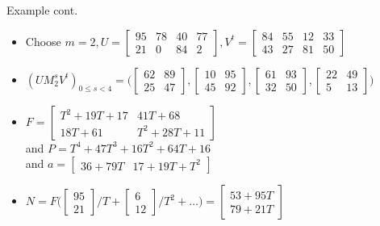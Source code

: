 \documentclass{beamer}
\begin{document}
\begin{frame}{Example cont.}
	\begin{itemize}
		\item Choose $m = 2, 
		U = \begin{bmatrix}
		95 & 78 & 40 & 77\\
		21 & 0  & 84 & 2
		\end{bmatrix},
		V^t = \begin{bmatrix}
		84 & 55 & 12 & 33\\
		43 & 27 & 81 & 50
		\end{bmatrix}
		$
		\item $(UM_2^sV^t)_{0 \le s < 4} = 
		\bigg(  
		\begin{bmatrix}
		62& 89\\
		25& 47
		\end{bmatrix},
		\begin{bmatrix}
		10& 95\\
		45& 92
		\end{bmatrix},
		\begin{bmatrix}
		61& 93\\
		32& 50
		\end{bmatrix},
		\begin{bmatrix}
		22& 49\\
		 5& 13
		\end{bmatrix} 
		\bigg)$
		\pause
		\item $F = \begin{bmatrix}
		T^2 + 19T + 17&       41T + 68\\
		      18T + 61& T^2 + 28T + 11
		\end{bmatrix}$\\
		 and $P = T^4 + 47T^3 + 16T^2 + 64T + 16$\\
		 and $a = \begin{bmatrix}
		       36 + 79T & 17 + 19T + T^2
		 \end{bmatrix}$
		 \pause
		 \item $N = F\bigg( 
		 \begin{bmatrix}
		 95\\21
		 \end{bmatrix}/T +
		 \begin{bmatrix}
		 6\\12
		 \end{bmatrix}/T^2 + \dots
		 \bigg) =
		 \begin{bmatrix}
		 53+95T\\79+21T
		 \end{bmatrix}$ \\

\end{itemize}
\end{frame}
\end{document}
